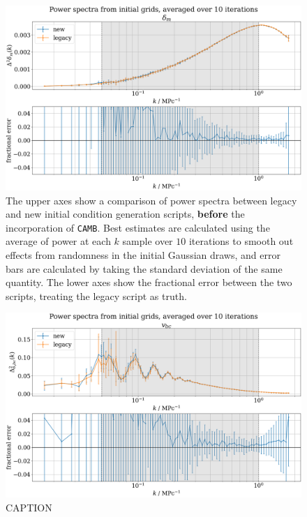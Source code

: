\documentclass[floats,floatfix,showpacs,amssymb,prd,superscriptaddress,nofootinbib]{revtex4-2} %
\newcommand{\code}{\texttt}
\begin{document}
\newpage
\begin{figure}[H]
    \centering
    \includegraphics[width=0.9\columnwidth]{images/ic_power_spectra/compare_generators_averaged_power_spectra_with_residual_noCAMB_delta_m.png}
    \caption{The upper axes show a comparison of power spectra between legacy and new initial condition generation scripts, \textbf{before} the incorporation of \code{CAMB}. Best estimates are calculated using the average of power at each $k$ sample over $10$ iterations to smooth out effects from randomness in the initial Gaussian draws, and error bars are calculated by taking the standard deviation of the same quantity. The lower axes show the fractional error between the two scripts, treating the legacy script as truth.}
    \label{fig:compare_generators_power_spectrum_noCAMB_delta_m}
\end{figure}

\begin{figure}[H]
    \centering
    \includegraphics[width=0.9\columnwidth]{images/ic_power_spectra/compare_generators_averaged_power_spectra_with_residual_noCAMB_v_bc.png}
    \caption{CAPTION}
    \label{fig:compare_generators_power_spectrum_noCAMB_vbc}
\end{figure}
\end{document}
